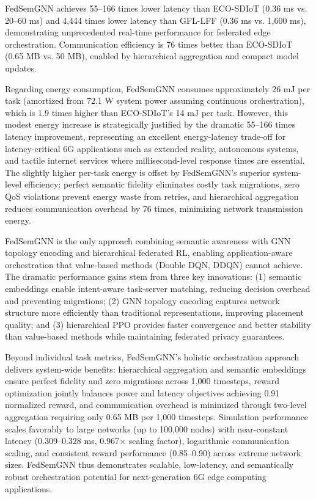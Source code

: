 \documentclass[conference]{IEEEtran}
\begin{document}
	FedSemGNN achieves 55--166 times lower latency than ECO-SDIoT (0.36 ms vs. 20--60 ms) and 4,444 times lower latency than GFL-LFF (0.36 ms vs. 1,600 ms), demonstrating unprecedented real-time performance for federated edge orchestration. Communication efficiency is 76 times better than ECO-SDIoT (0.65 MB vs. 50 MB), enabled by hierarchical aggregation and compact model updates.
	
	Regarding energy consumption, FedSemGNN consumes approximately 26 mJ per task (amortized from 72.1 W system power assuming continuous orchestration), which is 1.9 times higher than ECO-SDIoT's 14 mJ per task. However, this modest energy increase is strategically justified by the dramatic 55--166 times latency improvement, representing an excellent energy-latency trade-off for latency-critical 6G applications such as extended reality, autonomous systems, and tactile internet services where millisecond-level response times are essential. The slightly higher per-task energy is offset by FedSemGNN's superior system-level efficiency: perfect semantic fidelity eliminates costly task migrations, zero QoS violations prevent energy waste from retries, and hierarchical aggregation reduces communication overhead by 76 times, minimizing network transmission energy.
	
	FedSemGNN is the only approach combining semantic awareness with GNN topology encoding and hierarchical federated RL, enabling application-aware orchestration that value-based methods (Double DQN, DDQN) cannot achieve. The dramatic performance gains stem from three key innovations: (1) semantic embeddings enable intent-aware task-server matching, reducing decision overhead and preventing migrations; (2) GNN topology encoding captures network structure more efficiently than traditional representations, improving placement quality; and (3) hierarchical PPO provides faster convergence and better stability than value-based methods while maintaining federated privacy guarantees.
	
	Beyond individual task metrics, FedSemGNN's holistic orchestration approach delivers system-wide benefits: hierarchical aggregation and semantic embeddings ensure perfect fidelity and zero migrations across 1,000 timesteps, reward optimization jointly balances power and latency objectives achieving 0.91 normalized reward, and communication overhead is minimized through two-level aggregation requiring only 0.65 MB per 1,000 timesteps. Simulation performance scales favorably to large networks (up to 100,000 nodes) with near-constant latency (0.309--0.328 ms, 0.967$\times$ scaling factor), logarithmic communication scaling, and consistent reward performance (0.85--0.90) across extreme network sizes. FedSemGNN thus demonstrates scalable, low-latency, and semantically robust orchestration potential for next-generation 6G edge computing applications.
	
\end{document}
